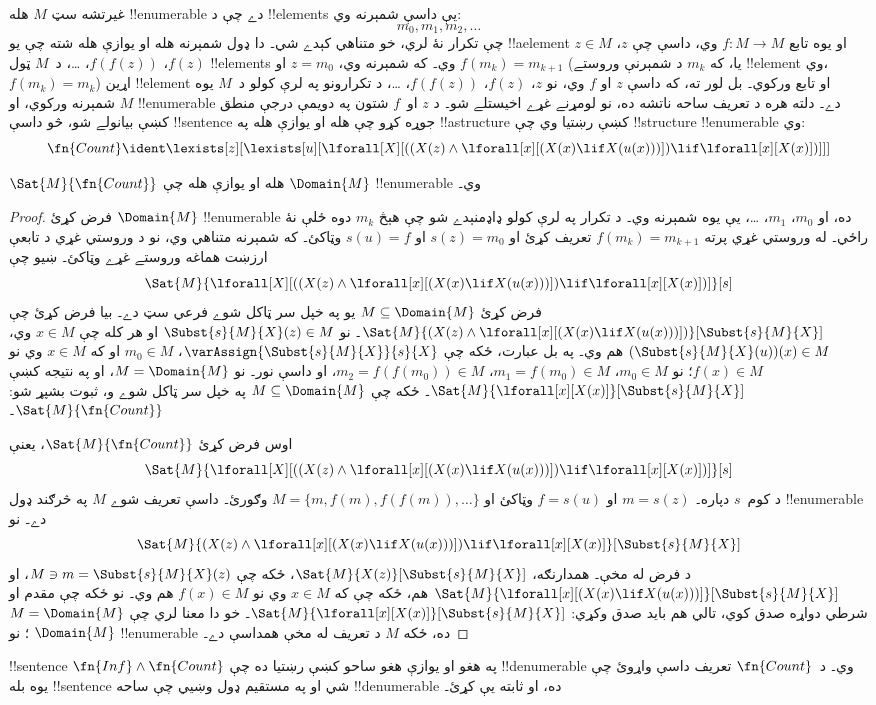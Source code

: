 \documentclass[../../../include/open-logic-section]{subfiles}
\begin{document}
غيرتشه سټ $M$ هله !!{enumerable} دے چې د !!{element}s يې داسې شمېرنه وي:
\[
m_0, m_1, m_2, \dots
\]
چې تکرار نۀ لري، خو متناهي کېدے شي۔ دا ډول شمېرنه هله او يوازې
هله شته چې يو !!a{element} $z \in M$ او يوه تابع $f\colon M \to M$
وي، داسې چې $z$، $f(z)$، $f(f(z))$، \dots، د~$M$ ټول !!{element}s
وي۔ که شمېرنه وي، $z = m_0$ او $f(m_k) = m_{k+1}$ (يا، که $m_k$
د شمېرنې وروستے !!{element} وي، $f(m_k) = m_k$) اړين !!{element} او تابع
ورکوي۔ بل لور ته، که داسې $z$ او $f$ وي، نو $z$، $f(z)$،
$f(f(z))$، \dots، د تکرارونو په لرې کولو د~$M$ يوه شمېرنه ورکوي، او $M$ !!{enumerable} دے۔
دلته هره د تعريف ساحه ناتشه ده، نو لومړنے غړے اخيستلے شو۔ د $z$ او~$f$ شتون په دويمې درجې منطق کښې بيانولے شو، څو داسې
!!{sentence} جوړه کړو چې هله او يوازې هله په !!a{structure} کښې
رښتيا وي چې !!{structure} !!{enumerable} وي:
\[
\fn{Count} \ident
\lexists[z][\lexists[u][\lforall[X][((X(z) \land
      \lforall[x][(X(x) \lif X(u(x)))]) \lif \lforall[x][X(x)])]]]
\]

\begin{prop}
$\Sat{M}{\fn{Count}}$ هله او يوازې هله چې $\Domain{M}$
!!{enumerable} وي۔
\end{prop}

\begin{proof}
فرض کړئ $\Domain{M}$ !!{enumerable} ده، او $m_0$، $m_1$، \dots،
يې يوه شمېرنه وي۔ د تکرار په لرې کولو ډاډمنېدے شو چې هېڅ $m_k$ دوه
ځلې نۀ راځي۔ له وروستي غړي پرته $f(m_k) = m_{k+1}$ تعريف کړئ او $s(z) = m_0$ او
$s(u) = f$ وټاکئ۔ که شمېرنه متناهي وي، نو د وروستي غړي د تابعې ارزښت هماغه وروستے غړے وټاکئ۔ ښيو چې
\[
\Sat{M}{\lforall[X][((X(z) \land \lforall[x][(X(x) \lif X(u(x)))])
    \lif \lforall[x][X(x)])]}[s]
\]
فرض کړئ $M \subseteq \Domain{M}$ يو په خپل سر ټاکل شوے فرعي سټ دے۔ بيا فرض
کړئ چې
$\Sat{M}{(X(z) \land \lforall[x][(X(x) \lif
X(u(x)))])}[\Subst{s}{M}{X}]$۔ نو $\Subst{s}{M}{X}(z) \in M$ او
هر کله چې $x \in M$ وي، $(\Subst{s}{M}{X}(u))(x) \in M$ هم وي۔ په
بل عبارت، ځکه چې $\varAssign{\Subst{s}{M}{X}}{s}{X}$، $m_0 \in M$
او که $x \in M$ وي نو $f(x) \in M$؛ نو $m_0 \in M$،
$m_1 = f(m_0) \in M$، $m_2 = f(f(m_0)) \in M$، او داسې نور۔ نو
$M = \Domain{M}$، او په نتيجه کښې
$\Sat{M}{\lforall[x][X(x)]}[\Subst{s}{M}{X}]$۔ ځکه چې
$M \subseteq \Domain{M}$ په خپل سر ټاکل شوے و، ثبوت بشپړ شو:
$\Sat{M}{\fn{Count}}$۔

اوس فرض کړئ $\Sat{M}{\fn{Count}}$، يعنې
\[
\Sat{M}{\lforall[X][((X(z) \land \lforall[x][(X(x) \lif X(u(x)))])
    \lif \lforall[x][X(x)])]}[s]
\]
د کوم~$s$ دپاره۔ $m = s(z)$ او $f = s(u)$ وټاکئ او
$M = \{m, f(m), f(f(m)), \dots\}$ وګورئ۔ داسې تعريف شوے $M$ په
څرګند ډول !!{enumerable} دے۔ نو
\[
\Sat{M}{(X(z) \land \lforall[x][(X(x) \lif X(u(x)))])
    \lif \lforall[x][X(x)]}[\Subst{s}{M}{X}]
\]
د فرض له مخې۔ همدارنګه،
$\Sat{M}{X(z)}[\Subst{s}{M}{X}]$، ځکه چې $M \ni m =
\Subst{s}{M}{X}(z)$، او
$\Sat{M}{\lforall[x][(X(x) \lif
X(u(x)))]}[\Subst{s}{M}{X}]$ هم، ځکه چې که $x \in M$ وي نو
$f(x) \in M$ هم وي۔ نو ځکه چې مقدم او شرطي دواړه صدق کوي، تالي
هم بايد صدق وکړي:
$\Sat{M}{\lforall[x][X(x)]}[\Subst{s}{M}{X}]$۔ خو دا معنا لري چې
$M = \Domain{M}$؛ نو $\Domain{M}$ !!{enumerable} ده، ځکه $M$
د تعريف له مخې همداسې دے۔
\end{proof}

\begin{prob}
!!{sentence} $\fn{Inf} \land \fn{Count}$ په هغو او يوازې هغو
ساحو کښې رښتيا ده چې !!{denumerable} وي۔ د~$\fn{Count}$ تعريف داسې
واړوئ چې يوه بله !!{sentence} شي او په مستقيم ډول وښيي چې ساحه
!!{denumerable} ده، او ثابته يې کړئ۔
\end{prob}
\end{document}
